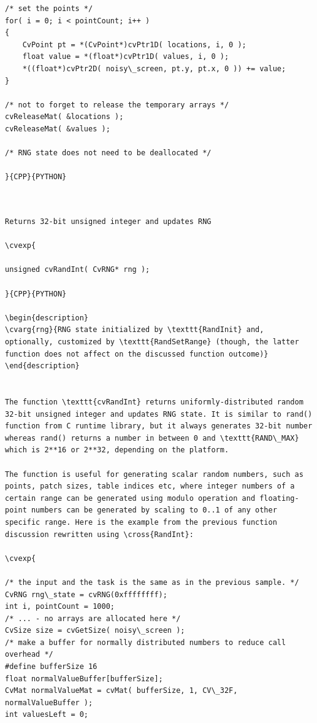 \begin{verbatim}
/* set the points */
for( i = 0; i < pointCount; i++ )
{
    CvPoint pt = *(CvPoint*)cvPtr1D( locations, i, 0 );
    float value = *(float*)cvPtr1D( values, i, 0 );
    *((float*)cvPtr2D( noisy\_screen, pt.y, pt.x, 0 )) += value;
}

/* not to forget to release the temporary arrays */
cvReleaseMat( &locations );
cvReleaseMat( &values );

/* RNG state does not need to be deallocated */

}{CPP}{PYTHON}


\end{verbatim}
\label{RandInt}
\begin{verbatim}

Returns 32-bit unsigned integer and updates RNG

\cvexp{

unsigned cvRandInt( CvRNG* rng );

}{CPP}{PYTHON}

\begin{description}
\cvarg{rng}{RNG state initialized by \texttt{RandInit} and, optionally, customized by \texttt{RandSetRange} (though, the latter function does not affect on the discussed function outcome)}
\end{description}


The function \texttt{cvRandInt} returns uniformly-distributed random 32-bit unsigned integer and updates RNG state. It is similar to rand() function from C runtime library, but it always generates 32-bit number whereas rand() returns a number in between 0 and \texttt{RAND\_MAX} which is 2**16 or 2**32, depending on the platform.

The function is useful for generating scalar random numbers, such as points, patch sizes, table indices etc, where integer numbers of a certain range can be generated using modulo operation and floating-point numbers can be generated by scaling to 0..1 of any other specific range. Here is the example from the previous function discussion rewritten using \cross{RandInt}:

\cvexp{

/* the input and the task is the same as in the previous sample. */
CvRNG rng\_state = cvRNG(0xffffffff);
int i, pointCount = 1000;
/* ... - no arrays are allocated here */
CvSize size = cvGetSize( noisy\_screen );
/* make a buffer for normally distributed numbers to reduce call overhead */
#define bufferSize 16
float normalValueBuffer[bufferSize];
CvMat normalValueMat = cvMat( bufferSize, 1, CV\_32F, normalValueBuffer );
int valuesLeft = 0;


\end{verbatim}
